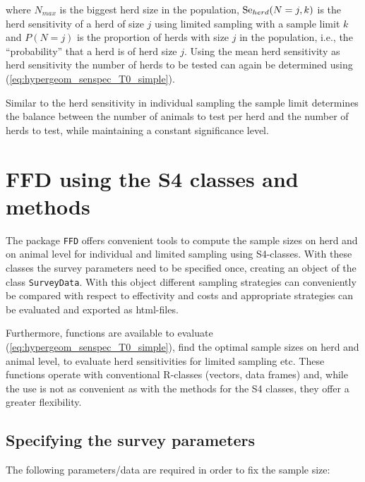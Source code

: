 \documentclass[nojss]{jss}
\begin{document}
where $N_{max}$ is the biggest herd size in the population, 
$\mbox{Se}_{herd}(N=j,k)$ is the herd sensitivity of a herd of size $j$ 
using limited sampling with a sample limit $k$ and $P(N=j)$ is the 
proportion of herds with size $j$ in the population, i.e., the 
``probability'' that a herd is of herd size $j$. Using the mean herd 
sensitivity as herd sensitivity the number of herds to be tested can 
again be determined using (\ref{eq:hypergeom_senspec_T0_simple}). 

Similar to the herd sensitivity in individual sampling the sample 
limit determines the balance between the number of animals to test 
per herd and the number of herds to test, while maintaining a 
constant significance level.  

%
%

\section{FFD using the S4 classes and methods}
\label{sec:using-ffd-S4}

The package \texttt{FFD} offers convenient tools to compute the 
sample sizes on herd and on animal level for individual and limited 
sampling using S4-classes. With these classes the survey parameters 
need to be specified once, creating an object of the class 
\texttt{SurveyData}. With this object different sampling strategies 
can conveniently be compared with respect to effectivity and costs 
and appropriate strategies can be evaluated and exported as 
html-files.

Furthermore, functions are available to evaluate 
(\ref{eq:hypergeom_senspec_T0_simple}), find the optimal sample 
sizes on herd and animal level, to evaluate herd sensitivities for 
limited sampling etc. These functions operate with conventional 
R-classes (vectors, data frames) and, while the use is not as 
convenient as with the methods for the S4 classes, they offer a 
greater flexibility. 


\subsection{Specifying the survey parameters}
\label{subsec:surveyData} 

The following parameters/data are required in order to fix the 
sample size: 
\end{document}
